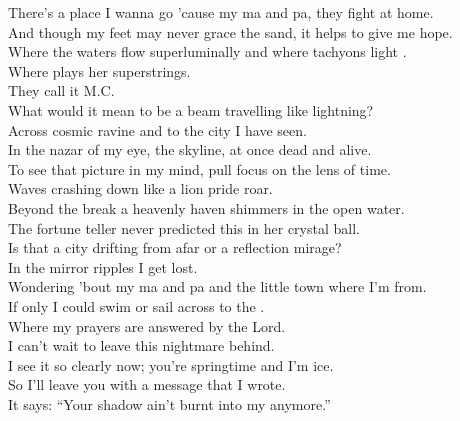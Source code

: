 
\label{album:flight-b741}



There's a place I wanna go 'cause my ma and pa, they fight at home. \\
And though my feet may never grace the sand, it helps to give me hope. \\
Where the waters flow superluminally and where tachyons light . \\
Where  plays her superstrings. \\
They call it M.C. \\

What would it mean to be a beam travelling like lightning? \\
Across cosmic ravine and to the city I have seen. \\
In the nazar of my eye, the skyline, at once dead and alive. \\
To see that picture in my mind, pull focus on the lens of time. \\

Waves crashing down like a lion pride roar. \\
Beyond the break a heavenly haven shimmers in the open water. \\
The fortune teller never predicted this in her crystal ball. \\
Is that a city drifting from afar or a reflection mirage? \\

In the mirror ripples I get lost. \\
Wondering 'bout my ma and pa and the little town where I'm from. \\
If only I could swim or sail across to the . \\
Where my prayers are answered by the Lord. \\

I can't wait to leave this nightmare behind. \\
I see it so clearly now; you're springtime and I'm ice. \\
So I'll leave you with a message that I wrote. \\
It says: ``Your shadow ain't burnt into my  anymore.'' \\

